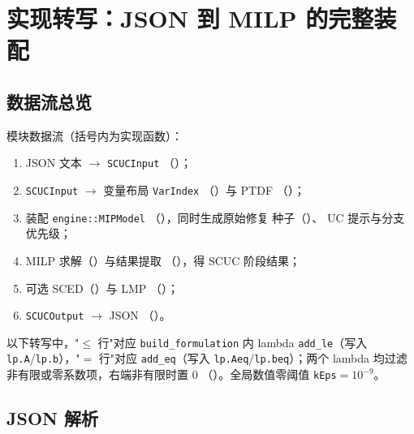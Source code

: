 
\section{实现转写：JSON 到 MILP 的完整装配}

\subsection{数据流总览}

模块数据流（括号内为实现函数）：

\begin{enumerate}
  \item JSON 文本 $\to$ \texttt{SCUCInput}
        （）；
  \item \texttt{SCUCInput} $\to$ 变量布局 \texttt{VarIndex}
        （）与 PTDF
        （）；
  \item 装配 \texttt{engine::MIPModel}
        （），同时生成原始修复
        种子（）、
        UC 提示与分支优先级；
  \item MILP 求解（）与结果提取
        （），得 SCUC 阶段结果；
  \item 可选 SCED（）与 LMP
        （）；
  \item \texttt{SCUCOutput} $\to$ JSON
        （）。
\end{enumerate}

以下转写中，"$\le$ 行"对应 \texttt{build\_formulation} 内 lambda
\texttt{add\_le}（写入 \texttt{lp.A}/\texttt{lp.b}），"$=$ 行"对应
\texttt{add\_eq}（写入 \texttt{lp.Aeq}/\texttt{lp.beq}）；两个 lambda 均过滤
非有限或零系数项，右端非有限时置 0
（）。全局数值零阈值
\texttt{kEps}$=10^{-9}$。

\subsection{JSON 解析}
\label{sec:impl-json}

